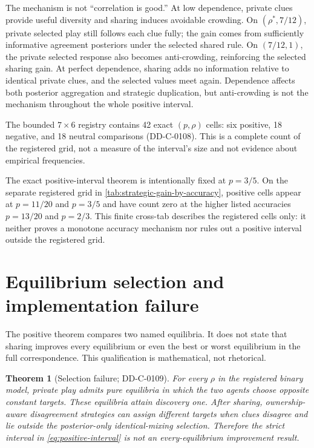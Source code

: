 \documentclass[12pt]{article}
\newtheorem{theorem}{Theorem}
\theoremstyle{definition}
\begin{document}



The mechanism is not ``correlation is good.'' At low dependence, private clues
provide useful diversity and sharing induces avoidable crowding. On
$(\rho^*,7/12)$, private selected play still follows each clue fully; the gain
comes from sufficiently informative agreement posteriors under the selected
shared rule. On $(7/12,1)$, the private selected response also becomes
anti-crowding, reinforcing the selected sharing gain. At perfect dependence,
sharing adds no information relative to identical private clues, and the
selected values meet again. Dependence affects both posterior aggregation and
strategic duplication, but anti-crowding is not the mechanism throughout the
whole positive interval.

The bounded $7\times6$ registry contains 42 exact $(p,\rho)$ cells: six positive,
18 negative, and 18 neutral comparisons (DD-C-0108). This is a complete count of
the registered grid, not a measure of the interval's size and not evidence about
empirical frequencies.



The exact positive-interval theorem is intentionally fixed at $p=3/5$. On the
separate registered grid in \cref{tab:strategic-gain-by-accuracy}, positive cells
appear at $p=11/20$ and $p=3/5$ and have count zero at the higher listed
accuracies $p=13/20$ and $p=2/3$. This finite cross-tab describes the registered
cells only: it neither proves a monotone accuracy mechanism nor rules out a
positive interval outside the registered grid.

\section{Equilibrium selection and implementation failure}

The positive theorem compares two named equilibria. It does not state that
sharing improves every equilibrium or even the best or worst equilibrium in the
full correspondence. This qualification is mathematical, not rhetorical.

\begin{theorem}[Selection failure; DD-C-0109]
For every $\rho$ in the registered binary model, private play admits pure
equilibria in which the two agents choose opposite constant targets. These
equilibria attain discovery one. After sharing, ownership-aware disagreement
strategies can assign different targets when clues disagree and lie outside the
posterior-only identical-mixing selection. Therefore the strict interval in
\cref{eq:positive-interval} is not an every-equilibrium improvement result.
\end{theorem}
\end{document}
